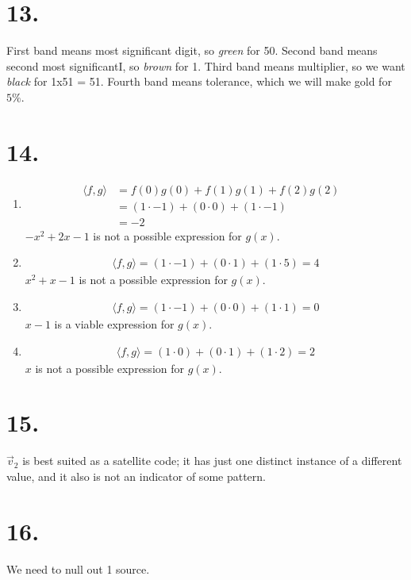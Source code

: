 \documentclass[11pt]{article}
\newenvironment{qparts}{\begin{enumerate}[{(}a{)}]}{\end{enumerate}}
\begin{document}
\section*{13.}
First band means most significant digit, so \textit{green} for 50.
Second band means second most significantI, so \textit{brown} for 1.
Third band means multiplier, so we want \textit{black} for 1x51 = 51.
Fourth band means tolerance, which we will make gold for $5\%$.
\newpage
\section*{14.}
\begin{qparts}
\item
\begin{align*}\langle f, g \rangle &= f(0)g(0) + f(1)g(1) + f(2)g(2)& 
    \\ &= (1 \cdot -1) + (0 \cdot 0) + (1 \cdot -1)& \\
    & = -2& \end{align*}
$-x^2 + 2x - 1$  is not a possible expression for $g(x)$.
\item
\begin{align*}\langle f, g \rangle = (1 \cdot -1) + (0 \cdot 1) + (1 \cdot 5) = 4\end{align*}
$x^2 + x - 1$ is not a possible expression for $g(x)$.
\item
\begin{align*}\langle f, g \rangle = (1 \cdot -1) + (0 \cdot 0) + (1 \cdot 1) = 0\end{align*}
$x-1$ is a viable expression for $g(x)$.
\item
\begin{align*}\langle f, g \rangle = (1 \cdot 0) + (0 \cdot 1) + (1 \cdot 2) = 2\end{align*}
$x$ is not a possible expression for $g(x)$.
\end{qparts}

\newpage
\section*{15.}
$\vec{v}_2$ is best suited as a satellite code; it has just one distinct instance of a different value, and it also is not an indicator of some pattern.

\newpage
\section*{16.}
We need to null out 1 source.
\newpage
\end{document}
